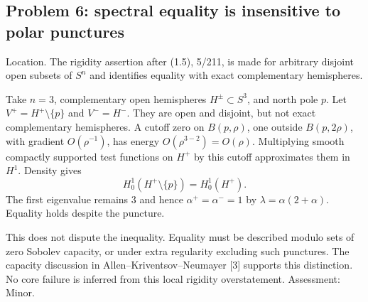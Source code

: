 \documentclass[10pt]{article}
\begin{document}
\subsection*{Problem 6: spectral equality is insensitive to polar punctures}
Location. The rigidity assertion after (1.5), 5/211, is made for arbitrary disjoint open subsets of \(S^n\) and identifies equality with exact complementary hemispheres.\par
Take \(n=3\), complementary open hemispheres \(H^\pm\subset S^3\), and north pole \(p\). Let \(V^+=H^+\setminus\{p\}\) and \(V^-=H^-\). They are open and disjoint, but not exact complementary hemispheres. A cutoff zero on \(B(p,\rho)\), one outside \(B(p,2\rho)\), with gradient \(O(\rho^{-1})\), has energy \(O(\rho^{3-2})=O(\rho)\). Multiplying smooth compactly supported test functions on \(H^+\) by this cutoff approximates them in \(H^1\). Density gives \[H_0^1(H^+\setminus\{p\})=H_0^1(H^+).\] The first eigenvalue remains \(3\) and hence \(\alpha^+=\alpha^-=1\) by \(\lambda=\alpha(2+\alpha)\). Equality holds despite the puncture.\par
This does not dispute the inequality. Equality must be described modulo sets of zero Sobolev capacity, or under extra regularity excluding such punctures. The capacity discussion in Allen–Kriventsov–Neumayer [3] supports this distinction. No core failure is inferred from this local rigidity overstatement. Assessment: Minor.\par
\end{document}
